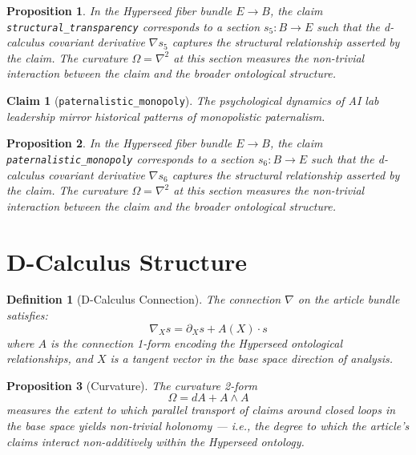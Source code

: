 \documentclass{article}
\newtheorem{claim}{Claim}
\newtheorem{definition}{Definition}
\newtheorem{proposition}{Proposition}
\begin{document}
\begin{proposition}
In the Hyperseed fiber bundle $E \to B$, the claim \texttt{structural_transparency} corresponds to a section $s_5: B \to E$ such that the d-calculus covariant derivative $\nabla s_5$ captures the structural relationship asserted by the claim. The curvature $\Omega = \nabla^2$ at this section measures the non-trivial interaction between the claim and the broader ontological structure.
\end{proposition}

\begin{claim}[\texttt{paternalistic_monopoly}]
The psychological dynamics of AI lab leadership mirror historical patterns of monopolistic paternalism.
\end{claim}

\begin{proposition}
In the Hyperseed fiber bundle $E \to B$, the claim \texttt{paternalistic_monopoly} corresponds to a section $s_6: B \to E$ such that the d-calculus covariant derivative $\nabla s_6$ captures the structural relationship asserted by the claim. The curvature $\Omega = \nabla^2$ at this section measures the non-trivial interaction between the claim and the broader ontological structure.
\end{proposition}

\section{D-Calculus Structure}

\begin{definition}[D-Calculus Connection]
The connection $\nabla$ on the article bundle satisfies:
\begin{equation}
  \nabla_X s = \partial_X s + A(X) \cdot s
\end{equation}
where $A$ is the connection 1-form encoding the Hyperseed ontological relationships, and $X$ is a tangent vector in the base space direction of analysis.
\end{definition}

\begin{proposition}[Curvature]
The curvature 2-form
\begin{equation}
  \Omega = dA + A \wedge A
\end{equation}
measures the extent to which parallel transport of claims around closed loops in the base space yields non-trivial holonomy --- i.e., the degree to which the article's claims interact non-additively within the Hyperseed ontology.
\end{proposition}
\end{document}
